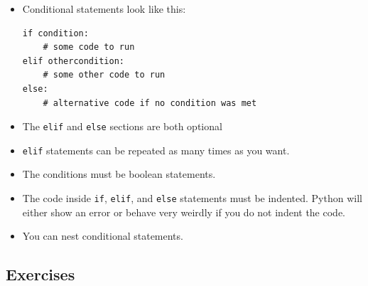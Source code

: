 \documentclass[11pt]{cselabheader}
\begin{document}
\begin{itemize}
  \item Conditional statements look like this:
    \begin{lstlisting}
if condition:
    # some code to run
elif othercondition:
    # some other code to run
else:
    # alternative code if no condition was met
    \end{lstlisting}

  \item The \lstinline!elif! and \lstinline!else! sections are both optional
  \item \lstinline!elif! statements can be repeated as many times as you want.
  \item The conditions must be boolean statements.
  \item The code inside \lstinline!if!, \lstinline!elif!, and \lstinline!else!
    statements must be indented. Python will either show an error or behave very
    weirdly if you do not indent the code.
  \item You can nest conditional statements.
\end{itemize}

\subsection{Exercises}
\label{subsec:ifex}
\end{document}
